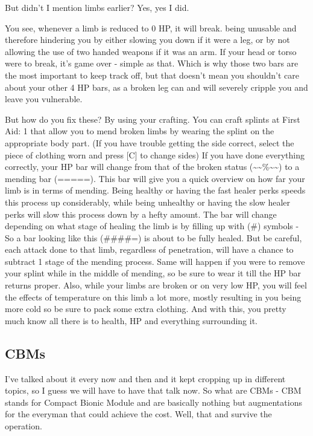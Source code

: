 But didn't I mention limbs earlier? Yes, yes I did.

You see, whenever a limb is reduced to 0 HP, it will break. being unusable and therefore hindering you by either slowing you down if it were a leg, or by not allowing the use of two handed weapons if it was an arm. If your head or torso were to break, it's game over - simple as that. Which is why those two bars are the most important to keep track off, but that doesn't mean you shouldn't care about your other 4 HP bars, as a broken leg can and will severely cripple you and leave you vulnerable.

But how do you fix these? By using your crafting. You can craft splints at First Aid: 1 that allow you to mend broken limbs by wearing the splint on the appropriate body part. (If you have trouble getting the side correct, select the piece of clothing worn and press [C] to change sides) If you have done everything correctly, your HP bar will change from that of the broken status (\~{}\~{}\%\~{}\~{}) to a mending bar (=====). This bar will give you a quick overview on how far your limb is in terms of mending. Being healthy or having the fast healer perks speeds this process up considerably, while being unhealthy or having the slow healer perks will slow this process down by a hefty amount. The bar will change depending on what stage of healing the limb is by filling up with (\#) symbols - So a bar looking like this (\#\#\#\#=) is about to be fully healed. But be careful, each attack done to that limb, regardless of penetration, will have a chance to subtract 1 stage of the mending process. Same will happen if you were to remove your splint while in the middle of mending, so be sure to wear it till the HP bar returns proper. Also, while your limbs are broken or on very low HP, you will feel the effects of temperature on this limb a lot more, mostly resulting in you being more cold so be sure to pack some extra clothing. And with this, you pretty much know all there is to health, HP and everything surrounding it.

\subsection{CBMs}

I've talked about it every now and then and it kept cropping up in different topics, so I guess we will have to have that talk now. So what are CBMs - CBM stands for Compact Bionic Module and are basically nothing but augmentations for the everyman that could achieve the cost. Well, that and survive the operation.

